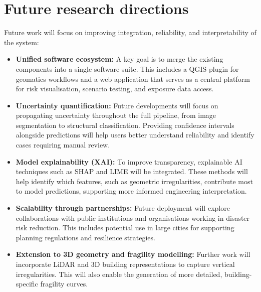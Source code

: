 \renewcommand{\sectionnametext}{Future research directions}
\renewcommand{\headingtextR}{\thesection. \sectionnametext}
\section{\sectionnametext}

Future work will focus on improving integration, reliability, and interpretability of the system:

\begin{itemize}
    \item \textbf{Unified software ecosystem:} A key goal is to merge the existing components into a single software suite. This includes a QGIS plugin for geomatics workflows and a web application that serves as a central platform for risk visualisation, scenario testing, and exposure data access.

    \item \textbf{Uncertainty quantification:} Future developments will focus on propagating uncertainty throughout the full pipeline, from image segmentation to structural classification. Providing confidence intervals alongside predictions will help users better understand reliability and identify cases requiring manual review.

    \item \textbf{Model explainability (XAI):} To improve transparency, explainable AI techniques such as SHAP and LIME will be integrated. These methods will help identify which features, such as geometric irregularities, contribute most to model predictions, supporting more informed engineering interpretation.

    \item \textbf{Scalability through partnerships:} Future deployment will explore collaborations with public institutions and organisations working in disaster risk reduction. This includes potential use in large cities for supporting planning regulations and resilience strategies.

    \item \textbf{Extension to 3D geometry and fragility modelling:} Further work will incorporate LiDAR and 3D building representations to capture vertical irregularities. This will also enable the generation of more detailed, building-specific fragility curves.
\end{itemize}

\renewcommand{\sectionnametext}{Closing remarks}
\renewcommand{\headingtextR}{\thesection. \sectionnametext}
